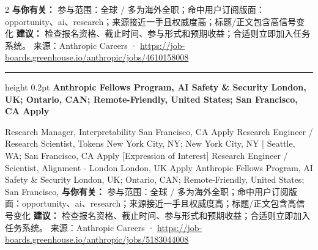 \documentclass[10.5pt]{ctexart}
\begin{document}
\begin{multicols}{2}
\textbf{与你有关：} 参与范围：全球 / 多为海外全职；命中用户订阅版面：opportunity、ai、research；来源接近一手且权威度高；标题/正文包含高信号变化
\textbf{建议：} 检查报名资格、截止时间、参与形式和预期收益；合适则立即加入任务系统。
{\footnotesize\color{ormuted} 来源：Anthropic Careers · \url{https://job-boards.greenhouse.io/anthropic/jobs/4610158008}}
\vspace{2mm}
\hrule height 0.2pt
\vspace{2mm}
{\large\bfseries Anthropic Fellows Program, AI Safety \& Security London, UK; Ontario, CAN; Remote-Friendly, United States; San Francisco, CA Apply}\par
[Expression of Interest] Research Manager, Interpretability San Francisco, CA Apply Research Engineer / Research Scientist, Tokens New York City, NY; New York City, NY | Seattle, WA; San Francisco, CA Apply [Expression of Interest] Research Engineer / Scientist, Alignment - London London, UK Apply Anthropic Fellows Program, AI Safety \& Security London, UK; Ontario, CAN; Remote-Friendly, United States; San Francisco, 
\textbf{与你有关：} 参与范围：全球 / 多为海外全职；命中用户订阅版面：opportunity、ai、research；来源接近一手且权威度高；标题/正文包含高信号变化
\textbf{建议：} 检查报名资格、截止时间、参与形式和预期收益；合适则立即加入任务系统。
{\footnotesize\color{ormuted} 来源：Anthropic Careers · \url{https://job-boards.greenhouse.io/anthropic/jobs/5183044008}}
\end{multicols}
\end{document}
